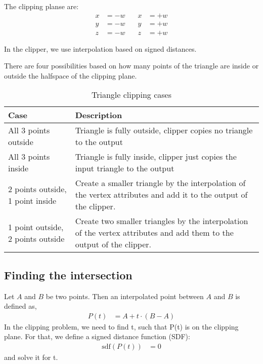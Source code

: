 The clipping planse are:
\begin{equation}
\begin{aligned}
x &= -w \quad & x &= +w \\
y &= -w \quad & y &= +w \\
z &= -w \quad & z &= +w
\end{aligned}
\label{eq:clipping_planes}
\end{equation}

In the clipper, we use interpolation based on signed distances.

There are four possibilities based on how many points of the triangle are inside or outside the halfspace of the clipping plane.


\begin{table}[h!]
\centering
\begin{tabular}{|l|p{10cm}|}
\hline
\textbf{Case} & \textbf{Description} \\
\hline
All 3 points outside & Triangle is fully outside, clipper copies no triangle to the output \\
\hline
All 3 points inside & Triangle is fully inside, clipper just copies the input triangle to the output \\
\hline
2 points outside, 1 point inside & Create a smaller triangle by the interpolation of the vertex attributes and add it to the output of the clipper. \\
\hline
1 point outside, 2 points outside & Create two smaller triangles by the interpolation of the vertex attributes and add them to the output of the clipper. \\
\hline
\end{tabular}
\caption{Triangle clipping cases}
\end{table}

\subsection{Finding the intersection}
Let $A$ and $B$ be two points.
Then an interpolated point between $A$ and $B$ is defined as,
\begin{align*}
P(t) &= A + t \cdot (B - A)
\end{align*}
In the clipping problem, we need to find t, such that P(t) is on the clipping plane.
For that, we define a signed distance function (SDF):
\begin{align*}
\text{sdf}(P(t)) &= 0
\end{align*}
and solve it for t.

